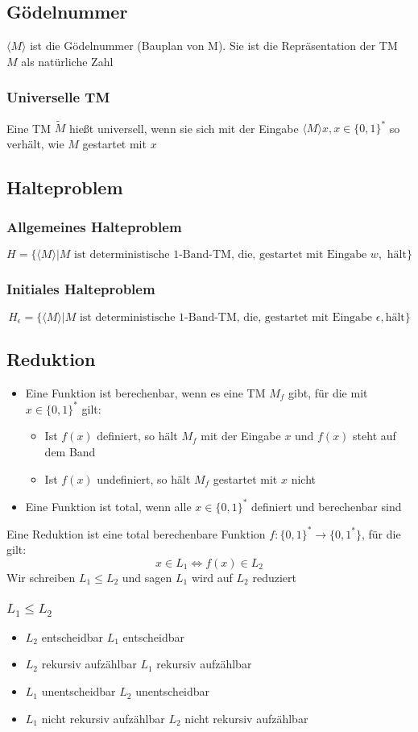 \documentclass{article}
\begin{document}
\subsection{Gödelnummer}
$\langle M\rangle$ ist die Gödelnummer (Bauplan von M). Sie ist die Repräsentation der TM $M$ als natürliche Zahl
\subsubsection{Universelle TM}
Eine TM $\tilde{M}$ hießt universell, wenn sie sich mit der Eingabe $\langle M \rangle x, x\in\{0, 1\}^*$ so verhält, wie $M$ gestartet mit $x$
\subsection{Halteproblem}
\subsubsection{Allgemeines Halteproblem}
$$
	H=\{\langle M\rangle|M \text{ ist deterministische 1-Band-TM, die, gestartet mit Eingabe } w, \text{ hält} \}
$$
\subsubsection{Initiales Halteproblem}
$$
	H_\epsilon=\{\langle M\rangle | M \text{ ist deterministische 1-Band-TM, die, gestartet mit Eingabe }\epsilon, \text{hält}\}
$$
\subsection{Reduktion}
\begin{itemize}
	\item Eine Funktion ist berechenbar, wenn es eine TM $M_f$ gibt, für die mit $x\in\{0,1\}^*$ gilt:
		\begin{itemize}
			\item Ist $f(x)$ definiert, so hält $M_f$ mit der Eingabe $x$ und $f(x)$ steht auf dem Band
			\item Ist $f(x)$ undefiniert, so hält $M_f$ gestartet mit $x$ nicht
		\end{itemize}
	\item Eine Funktion ist total, wenn alle $x\in\{0,1\}^*$ definiert und berechenbar sind 
\end{itemize}
Eine Reduktion ist eine total berechenbare Funktion $f:\{0,1\}^*\to\{0,1^*\}$, für die gilt:
$$
	x\in L_1 \Leftrightarrow f(x)\in L_2
$$ 
Wir schreiben \glqq{}$L_1\leq L_2$\grqq{} und sagen \glqq{} $L_1$ wird auf $L_2$ reduziert\glqq{}
\subsubsection{$L_1\leq L_2$}
\begin{itemize}
	\item $L_2$ entscheidbar \Rightarrow $L_1$ entscheidbar
	\item $L_2$ rekursiv aufzählbar \Rightarrow $L_1$ rekursiv aufzählbar
	\item $L_1$ unentscheidbar \Rightarrow $L_2$ unentscheidbar
	\item $L_1$ nicht rekursiv aufzählbar \Rightarrow $L_2$ nicht rekursiv aufzählbar
\end{itemize}
\end{document}

